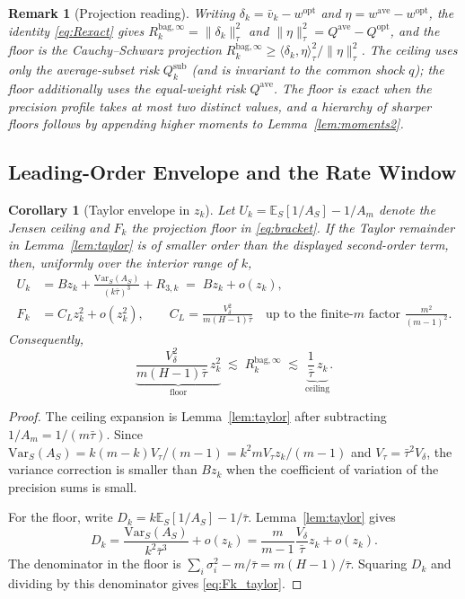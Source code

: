 \documentclass[12pt,a4paper]{article}
\newtheorem{corollary}{Corollary}[proposition]
\newtheorem{remark}{Remark}
\theoremstyle{definition}
\newcommand{\wopt}{w^{\mathrm{opt}}}
\newcommand{\wave}{w^{\mathrm{ave}}}
\newcommand{\Qopt}{Q^{\mathrm{opt}}}
\newcommand{\Qave}{Q^{\mathrm{ave}}}
\newcommand{\Qsub}{Q_k^{\mathrm{sub}}}
\newcommand{\Rk}{R_k^{\mathrm{bag},\infty}}
\newcommand{\vbar}{\bar{v}_k}
\newcommand{\E}{\mathbb{E}}
\newcommand{\Var}{\mathrm{Var}}
\begin{document}
\begin{remark}[Projection reading]
Writing $\delta_k=\vbar-\wopt$ and $\eta=\wave-\wopt$, the identity
\eqref{eq:Rexact} gives $\Rk=\|\delta_k\|_\tau^2$ and
$\|\eta\|_\tau^2=\Qave-\Qopt$, and the floor is the Cauchy--Schwarz
projection $\Rk\ge\langle\delta_k,\eta\rangle_\tau^2/\|\eta\|_\tau^2$.  The
ceiling uses only the average-subset risk $\Qsub$ (and is invariant to the
common shock $q$); the floor additionally uses the equal-weight risk $\Qave$.
The floor is \emph{exact} when the precision profile takes at most two
distinct values, and a hierarchy of sharper floors follows by appending
higher moments to Lemma~\ref{lem:moments2}.
\end{remark}

\subsection{Leading-Order Envelope and the Rate Window}

\begin{corollary}[Taylor envelope in $z_k$]\label{cor:env}
Let $U_k=\E_S[1/A_S]-1/A_m$ denote the Jensen ceiling and $F_k$ the
projection floor in \eqref{eq:bracket}.  If the Taylor remainder in
Lemma~\ref{lem:taylor} is of smaller order than the displayed second-order
term, then, uniformly over the interior range of $k$,
\begin{align}
  U_k
  &= Bz_k
     + \frac{\Var_S(A_S)}{(k\bar\tau)^3}
     + R_{3,k}
   \;=\; Bz_k+o(z_k), \label{eq:Uk_taylor}\\
  F_k
  &= C_L z_k^2+o(z_k^2),\qquad
     C_L=\frac{V_\delta^2}{m(H-1)\bar\tau}
     \quad\text{up to the finite-$m$ factor } \frac{m^2}{(m-1)^2}.
     \label{eq:Fk_taylor}
\end{align}
Consequently,
\begin{equation}\label{eq:env}
  \underbrace{\frac{V_\delta^2}{m(H-1)\bar\tau}\,z_k^2}_{\text{floor}}
  \;\lesssim\;\Rk\;\lesssim\;
  \underbrace{\frac{1}{\bar\tau}\,z_k}_{\text{ceiling}} .
\end{equation}
\end{corollary}

\begin{proof}
The ceiling expansion is Lemma~\ref{lem:taylor} after subtracting
$1/A_m=1/(m\bar\tau)$.  Since
$\Var_S(A_S)=k(m-k)V_\tau/(m-1)
=k^2mV_\tau z_k/(m-1)$ and $V_\tau=\bar\tau^2V_\delta$, the variance
correction is smaller than $Bz_k$ when the coefficient of variation of the
precision sums is small.

For the floor, write
$D_k=k\E_S[1/A_S]-1/\bar\tau$.  Lemma~\ref{lem:taylor} gives
\[
  D_k
  =\frac{\Var_S(A_S)}{k^2\bar\tau^3}+o(z_k)
  =\frac{m}{m-1}\frac{V_\delta}{\bar\tau}z_k+o(z_k).
\]
The denominator in the floor is
$\sum_i\sigma_i^2-m/\bar\tau=m(H-1)/\bar\tau$.  Squaring $D_k$ and dividing
by this denominator gives \eqref{eq:Fk_taylor}.
\end{proof}
\end{document}
